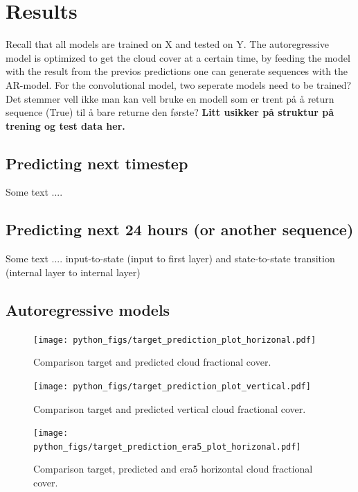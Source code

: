 \section{Results}
Recall that all models are trained on X and tested on Y. The autoregressive model is optimized to get the cloud cover at a certain time, by feeding the model with the result from the previos predictions one can generate sequences with the AR-model. For the convolutional model, two seperate models need to be trained? Det stemmer vell ikke man kan vell bruke en modell som er trent på å return sequence (True) til å bare returne den første? \textbf{Litt usikker på struktur på trening og test data her.}
\subsection{Predicting next timestep}
Some text ....

\subsection{Predicting next 24 hours (or another sequence)}
Some text ....
input-to-state (input to first layer) and state-to-state transition (internal layer to internal layer)

\subsection{Autoregressive models}

\begin{figure}[ht]
    \centering
    \texttt{[image: python\_figs/target\_prediction\_plot\_horizonal.pdf]}
    \caption{Comparison target and predicted cloud fractional cover.}
    \label{fig:target_predict_horizontal}
\end{figure}

\begin{figure}[ht]
    \centering
    \texttt{[image: python\_figs/target\_prediction\_plot\_vertical.pdf]}
    \caption{Comparison target and predicted vertical cloud fractional cover.}
    \label{fig:target_predict_vertical}
\end{figure}

\begin{figure}[ht]
    \centering
    \texttt{[image: python\_figs/target\_prediction\_era5\_plot\_horizonal.pdf]}
    \caption{Comparison target, predicted and era5 horizontal cloud fractional cover.}
    \label{fig:target_predict_era5_vertical}
\end{figure}

